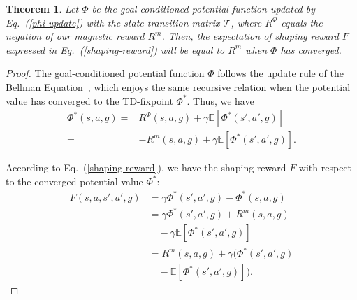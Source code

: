 \documentclass[journal]{IEEEtran}
\newtheorem{theorem}{Theorem}
\begin{document}
\begin{theorem}
    Let $\Phi$ be the goal-conditioned potential function updated by Eq.~(\ref{phi-update}) with the state transition matrix $\mathcal{T}$, where $R^{\Phi}$ equals the negation of our magnetic reward $R^{m}$. Then, the expectation of shaping reward $F$ expressed in Eq.~(\ref{shaping-reward}) will be equal to $R^{m}$ when $\Phi$ has converged.
\end{theorem}
\begin{proof}
    The goal-conditioned potential function $\Phi$ follows the update rule of the Bellman Equation~\citep{bellman1966dynamic}, which enjoys the same recursive relation when the potential value has converged to the TD-fixpoint $\Phi^{*}$. Thus, we have
    \begin{align}
         \Phi^{*}(s,a,g) =& R^{\Phi}(s,a,g) + \gamma\mathbb{E}[\Phi^{*}(s',a',g)]\nonumber\\
         =& -R^{m}(s,a,g) + \gamma\mathbb{E}[\Phi^{*}(s',a',g)].
    \end{align}

    
    According to Eq.~(\ref{shaping-reward}), we have the shaping reward $F$ with respect to the converged potential value $\Phi^{*}$:
    \begin{align}
         F(s,a,s',a',g) &= \gamma\Phi^{*}(s',a',g) - \Phi^{*}(s,a,g) \nonumber\\
         &= \gamma\Phi^{*}(s',a',g) + R^{m}(s,a,g) \nonumber\\
         &\quad - \gamma\mathbb{E}[\Phi^{*}(s',a',g)] \nonumber\\
         &= R^{m}(s,a,g) + \gamma(\Phi^{*}(s',a',g) \nonumber\\ 
         &\quad - \mathbb{E}[\Phi^{*}(s',a',g)]).
    \end{align}
    

\end{proof}
\end{document}
